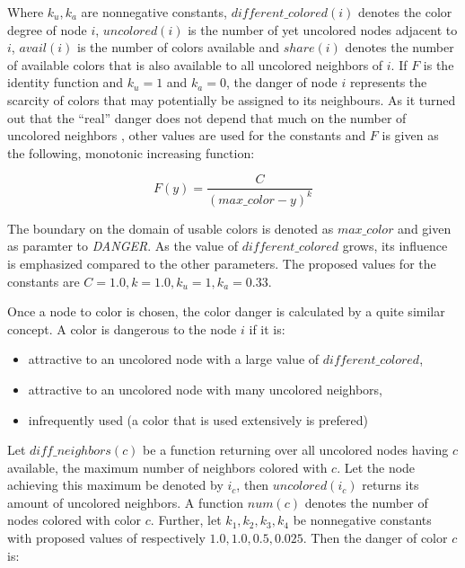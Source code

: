 Where $k_u, k_a$ are nonnegative constants, $\mathit{different\_colored}(i)$ denotes the color degree of node $i$, $\mathit{uncolored}(i)$ is the number of yet uncolored nodes adjacent to $i$, $\mathit{avail}(i)$ is the number of colors available and $\mathit{share}(i)$ denotes the number of available colors that is also available to all uncolored neighbors of $i$. If $F$ is the identity function and $k_u=1$ and $k_a=0$, the danger of node $i$ represents the scarcity of colors that may potentially be assigned to its neighbours. As it turned out that the ``real'' danger does not depend that much on the number of uncolored neighbors \cite{glover-96}, other values are used for the constants and $F$ is given as the following, monotonic increasing function:

$$ F(y) = \frac{C}{(\mathit{max\_color}-y)^k} $$

The boundary on the domain of usable colors is denoted as $\mathit{max\_color}$ and given as paramter to \textit{DANGER}. As the value of $\mathit{different\_colored}$ grows, its influence is emphasized compared to the other parameters. The proposed values for the constants are $C=1.0, k=1.0, k_u=1, k_a=0.33$.


Once a node to color is chosen, the color danger is calculated by a quite similar concept. A color is dangerous to the node $i$ if it is:

\begin{itemize}
\item attractive to an uncolored node with a large value of $\mathit{different\_colored}$,
\item attractive to an uncolored node with many uncolored neighbors,
\item infrequently used (a color that is used extensively is prefered)\cite{glover-96}
\end{itemize}

Let $\mathit{diff\_neighbors}(c)$ be a function returning over all uncolored nodes having $c$ available, the maximum number of neighbors colored with $c$. Let the node achieving this maximum be denoted by $i_c$, then $\mathit{uncolored}(i_c)$ returns its amount of uncolored neighbors. A function $num(c)$ denotes the number of nodes colored with color $c$. Further, let $k_1,k_2,k_3,k_4$ be nonnegative constants with proposed values of respectively $1.0,1.0,0.5,0.025$. Then the danger of color $c$ is:

